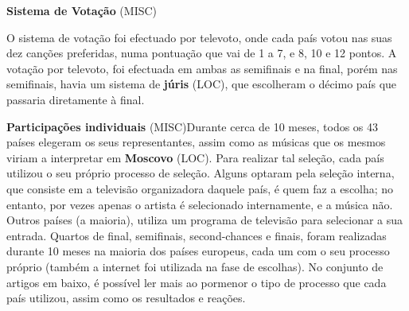 \documentclass[12pt,a4paper]{article}
\begin{document}
\textbf{Sistema de Votação} (MISC)

O sistema de votação foi efectuado por televoto, onde cada país votou nas suas dez canções preferidas, numa pontuação que vai de 1 a 7, e 8, 10 e 12 pontos. A votação por televoto, foi efectuada em ambas as semifinais e na final, porém nas semifinais, havia um sistema de \textbf{júris} (LOC), que escolheram o décimo país que passaria diretamente à final.



\textbf{Participações individuais} (MISC)Durante cerca de 10 meses, todos os 43 países elegeram os seus representantes, assim como as músicas que os mesmos viriam a interpretar em \textbf{Moscovo} (LOC). Para realizar tal seleção, cada país utilizou o seu próprio processo de seleção. Alguns optaram pela seleção interna, que consiste em a televisão organizadora daquele país, é quem faz a escolha; no entanto, por vezes apenas o artista é selecionado internamente, e a música não. Outros países (a maioria), utiliza um programa de televisão para selecionar a sua entrada. Quartos de final, semifinais, second-chances e finais, foram realizadas durante 10 meses na maioria dos países europeus, cada um com o seu processo próprio (também a internet foi utilizada na fase de escolhas). No conjunto de artigos em baixo, é possível ler mais ao pormenor o tipo de processo que cada país utilizou, assim como os resultados e reações.
\end{document}
